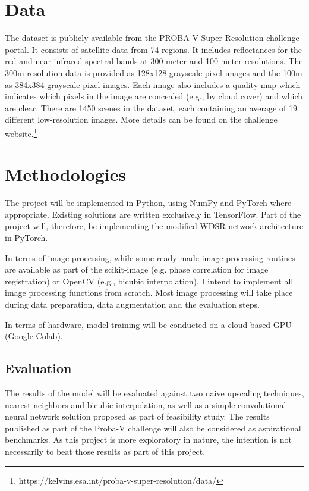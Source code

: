 \documentclass{article}
\begin{document}
\section{Data}

The dataset is publicly available from the PROBA-V Super Resolution challenge portal. It consists of satellite data from 74 regions. It includes reflectances for the red and near infrared spectral bands at 300 meter and 100 meter resolutions. The 300m resolution data is provided as 128x128 grayscale pixel images and the 100m as 384x384 grayscale pixel images. Each image also includes a quality map which indicates which pixels in the image are concealed (e.g., by cloud cover) and which are clear. There are 1450 scenes in the dataset, each containing an average of 19 different low-resolution images. More details can be found on the challenge website.\footnote{https://kelvins.esa.int/proba-v-super-resolution/data/}

\section{Methodologies}

The project will be implemented in Python, using NumPy and PyTorch where appropriate. Existing solutions are written exclusively in TensorFlow. Part of the project will, therefore, be implementing the modified WDSR network architecture in PyTorch. 

In terms of image processing, while some ready-made image processing routines are available as part of the scikit-image (e.g. phase correlation for image registration) or OpenCV (e.g., bicubic interpolation), I intend to implement all image processing functions from scratch. Most image processing will take place during data preparation, data augmentation and the evaluation steps.

In terms of hardware, model training will be conducted on a cloud-based GPU (Google Colab).

\subsection{Evaluation}

The results of the model will be evaluated against two naive upscaling techniques, nearest neighbors and bicubic interpolation, as well as a simple convolutional neural network solution proposed as part of \citet{Martens2021} feasibility study. The results published as part of the Proba-V challenge will also be considered as aspirational benchmarks. As this project is more exploratory in nature, the intention is not necessarily to beat those results as part of this project. 



\end{document}
